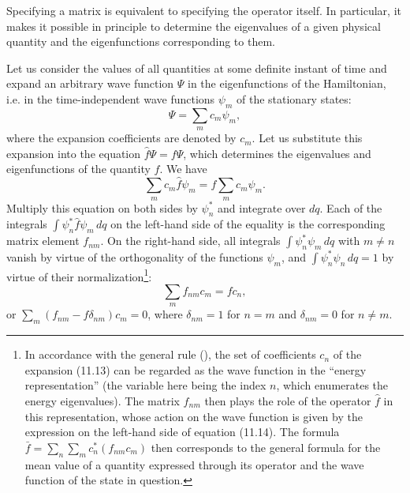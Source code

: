 Specifying a matrix is equivalent to specifying the operator itself. In
particular, it makes it possible in principle to determine the eigenvalues of a
given physical quantity and the eigenfunctions corresponding to them.

Let us consider the values of all quantities at some definite instant of time
and expand an arbitrary wave function $\Psi$ in the eigenfunctions of the
Hamiltonian, i.e. in the time-independent wave functions $\psi_m$ of the
stationary states:
\begin{equation}
  \Psi=\sum_m c_m\psi_m,
  \tag{11.13}
\end{equation}
where the expansion coefficients are denoted by $c_m$. Let us substitute this
expansion into the equation $\hat f\Psi=f\Psi$, which determines the
eigenvalues and eigenfunctions of the quantity $f$. We have
\[
  \sum_m c_m\hat f\psi_m=f\sum_m c_m\psi_m.
\]
Multiply this equation on both sides by $\psi_n^*$ and integrate over $dq$.
Each of the integrals $\int\psi_n^*\hat f\psi_m\,dq$ on the left-hand side of
the equality is the corresponding matrix element $f_{nm}$. On the right-hand
side, all integrals $\int\psi_n^*\psi_m\,dq$ with $m\ne n$ vanish by virtue of
the orthogonality of the functions $\psi_m$, and
$\int\psi_n^*\psi_n\,dq=1$ by virtue of their
normalization\footnote{In accordance with the general rule (), the set of
coefficients $c_n$ of the expansion (11.13) can be regarded as the wave function
in the ``energy representation'' (the variable here being the index $n$,
which enumerates the energy eigenvalues). The matrix $f_{nm}$ then plays the
role of the operator $\hat f$ in this representation, whose action on the wave
function is given by the expression on the left-hand side of equation (11.14).
The formula $\bar f=\sum_n\sum_m c_n^*(f_{nm}c_m)$ then corresponds to the
general formula for the mean value of a quantity expressed through its operator
and the wave function of the state in question.}:
\begin{equation}
  \sum_m f_{nm}c_m=fc_n,
  \tag{11.14}
\end{equation}
or $\sum_m(f_{nm}-f\delta_{nm})c_m=0$, where
$\delta_{nm}=1$ for $n=m$ and $\delta_{nm}=0$ for $n\ne m$.

